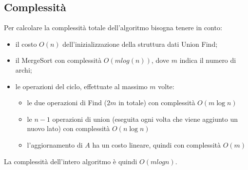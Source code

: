 	\subsection{Complessità}
		Per calcolare la complessità totale dell'algoritmo bisogna tenere in conto:
		\begin{itemize}
			\item il costo $O(n)$ dell'inizializzazione della struttura dati Union Find;
			\item il MergeSort con complessità $O(m log(n))$, dove $m$ indica il numero di archi;
			\item le operazioni del ciclo, effettuate al massimo $m$ volte:
			\begin{itemize}
				\item le due operazioni di Find ($2m$ in totale) con complessità $O(m \log n)$
				\item le $n-1$ operazioni di union (eseguita ogni volta che viene aggiunto un nuovo lato) con complessità $O(n \log n)$
				\item l'aggiornamento di $A$ ha un costo lineare, quindi con complessità $O(m)$
			\end{itemize}
		\end{itemize}
		La complessità dell'intero algoritmo è quindi $O(mlogn)$.

\pagebreak
